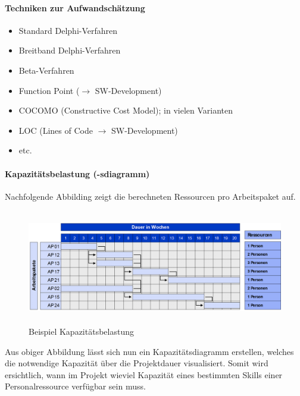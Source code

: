 \documentclass[a4paper]{article}
\begin{document}
			\paragraph{Techniken zur Aufwandschätzung}
			
			\begin{itemize}
				\item Standard Delphi-Verfahren
				\item Breitband Delphi-Verfahren
				\item Beta-Verfahren
				\item Function Point ($\rightarrow$ SW-Development)
				\item COCOMO (Constructive Cost Model); in vielen Varianten
				\item LOC (Lines of Code $\rightarrow$ SW-Development)
				\item etc.
			\end{itemize}
			
\newpage

			\paragraph{Kapazitätsbelastung (-sdiagramm)}
			
			Nachfolgende Abbilding zeigt die berechneten Ressourcen pro Arbeitspaket auf.
			
			\begin{figure}[!htb]
				\centering
				\includegraphics[height=5cm]{img/pm/belastung.png}
				\caption{Beispiel Kapazitätsbelastung}
				\label{fig:pm_belastung}
			\end{figure}
			\noindent
			Aus obiger Abbildung lässt sich nun ein Kapazitätsdiagramm erstellen, welches die notwendige Kapazität über die Projektdauer visualisiert.
			Somit wird ersichtlich, wann im Projekt wieviel Kapazität eines bestimmten Skills einer Personalressource verfügbar sein muss.
		
\end{document}
